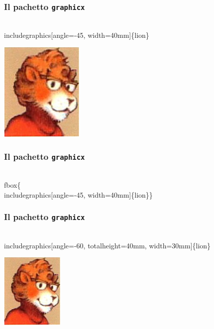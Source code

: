 \documentclass[svgnames,%
	ucs,%
	pdftex]{guitbeamer}
\begin{document}
\begin{frame}
  \frametitle{Il pachetto \texttt{graphicx}}
	\begin{LaTeXcode}
		\\includegraphics\alert{[angle=-45, width=40mm]}\{lion\}
	\end{LaTeXcode}
	\begin{center}
		\includegraphics[angle=-45, width=40mm]{lion}
	\end{center}
\end{frame}
\begin{frame}
  \frametitle{Il pachetto \texttt{graphicx}}
	\begin{LaTeXcode}
		\alert{\\fbox\{}\\includegraphics[angle=-45, width=40mm]\{lion\}\alert{\}}
	\end{LaTeXcode}
	\begin{center}
	\end{center}
\end{frame}
\begin{frame}
  \frametitle{Il pachetto \texttt{graphicx}}
	\begin{LaTeXcode}
		\\includegraphics\alert{[angle=-60, totalheight=40mm, width=30mm]}\{lion\}
	\end{LaTeXcode}
	\begin{center}
		\includegraphics[angle=-60, totalheight=40mm, width=30mm]{lion}
	\end{center}
\end{frame}
\end{document}

